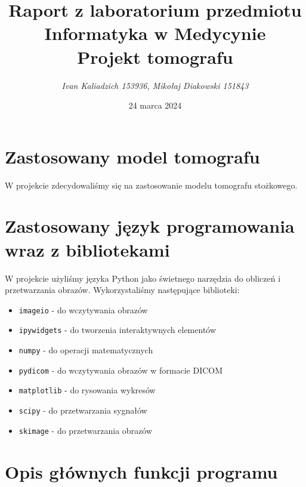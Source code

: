\documentclass[11pt,a4paper]{article}
\title{Raport z laboratorium przedmiotu\\Informatyka w Medycynie\\Projekt tomografu}
\author{\emph{Ivan Kaliadzich 153936, Mikołaj Diakowski 151843}}
\date{24 marca 2024}
\begin{document}
\maketitle
    \section{Zastosowany model tomografu}
    W projekcie zdecydowaliśmy się na zastosowanie modelu tomografu stożkowego.
    \section{Zastosowany język programowania wraz z bibliotekami}
    W projekcie użyliśmy języka Python jako świetnego narzędzia do obliczeń i przetwarzania obrazów.
    Wykorzystaliśmy
    następujące biblioteki:
    \begin{itemize}
        \item \texttt{imageio} - do wczytywania obrazów
        \item \texttt{ipywidgets} - do tworzenia interaktywnych elementów
        \item \texttt{numpy} - do operacji matematycznych
        \item \texttt{pydicom} - do wczytywania obrazów w formacie DICOM
        \item \texttt{matplotlib} - do rysowania wykresów
        \item \texttt{scipy} - do przetwarzania sygnałów
        \item \texttt{skimage} - do przetwarzania obrazów
        \end{itemize}
    \section{Opis głównych funkcji programu}
\end{document}
